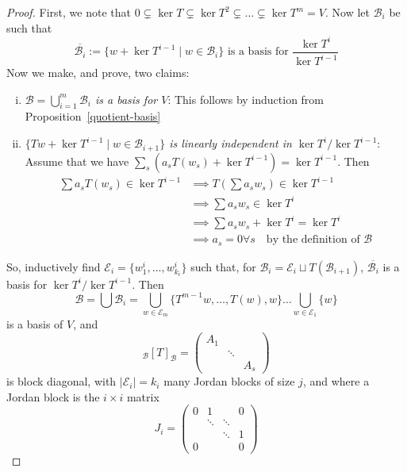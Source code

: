 \documentclass[10pt,fleqn]{article}
\newcommand{\basis}{\mathcal{B}}
\newcommand{\varbasis}{\mathcal{E}}
\theoremstyle{definition} \newtheorem{defn}{Definition}[section]
\theoremstyle{plain}      \newtheorem{thm}[defn]{Theorem}
\theoremstyle{plain}      \newtheorem{prop}[defn]{Proposition}
\theoremstyle{plain}      \newtheorem{lem}[defn]{Lemma}
\theoremstyle{plain}      \newtheorem{cor}[defn]{Corollary}
\theoremstyle{plain}      \newtheorem{ad}[defn]{Addendum}
\theoremstyle{definition} \newtheorem{ex}[defn]{Example}
\theoremstyle{definition} \newtheorem{rem}[defn]{Remark}
\numberwithin{equation}{subsection}
\begin{document}
\begin{proof}
    First, we note that $0\subsetneq\ker T\subsetneq\ker T^2\subsetneq\ldots\subsetneq\ker T^{m}=V$.
    Now let $\basis_i$ be such that
    \[
        \overline{\basis_i}:=
        \{w+\ker T^{i-1}\mid w\in\basis_i\}\text{ is a basis for }
        \frac{\ker T^i}{\ker T^{i-1}}
    \]
    Now we make, and prove, two claims:
    \begin{enumerate}[(i)]
        \item\emph{$\basis=\bigcup_{i=1}^m\basis_i$ is a basis for $V$}:
        This follows by induction from Proposition~\ref{quotient-basis}
        \item\emph{$\{Tw+\ker T^{i-1}\mid w\in\basis_{i+1}\}$ is linearly independent in $\ker T^i/\ker T^{i-1}$}:
        Assume that we have $\sum_s(a_sT(w_s)+\ker T^{i-1})=\ker T^{i-1}$.
        Then
        \begin{align*}
            \sum a_sT(w_s)\in\ker T^{i-1}
            &\implies
            T(\sum a_s w_s)\in\ker T^{i-1}\\
            &\implies
            \sum a_s w_s\in\ker T^i\\
            &\implies
            \sum a_s w_s+\ker T^i=\ker T^i\\
            &\implies a_s=0\forall s\quad\text{by the definition of }\basis
        \end{align*}
    \end{enumerate}
    So, inductively find $\varbasis_i=\{w_1^i,\ldots,w_{k_i}^i\}$ such that, for $\basis_i=\varbasis_i\sqcup T(\basis_{i+1})$, $\overline{\basis_i}$ is a basis for $\ker T^i/\ker T^{i-1}$.
    Then
    \[
        \basis=
        \bigcup\basis_i=
        \bigcup_{w\in\varbasis_m}\{T^{m-1}w,\ldots,T(w),w\}\ldots\bigcup_{w\in\varbasis_1}\{w\}
    \]
    is a basis of $V$, and
    \[
        _{\basis}[T]_{\basis}=
        \left(
        \begin{array}{ccc}
            A_1&&\\
            &\ddots&\\
            &&A_s
        \end{array}
        \right)
    \]
    is block diagonal, with $|\varbasis_i|=k_i$ many Jordan blocks of size $j$, and where a Jordan block is the $i\times i$ matrix
    \[
        J_i=
        \left(
        \begin{array}{cccc}
        0&1&&0\\
        &\ddots&\ddots&\\
        &&\ddots&1\\
        0&&&0
        \end{array}
        \right)
    \]
\end{proof}
\end{document}
